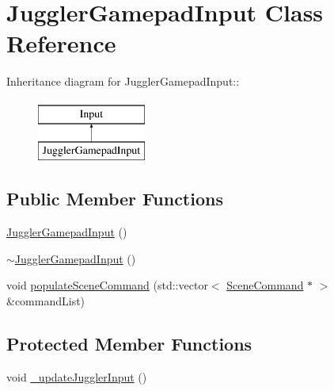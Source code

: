 \hypertarget{class_juggler_gamepad_input}{
\section{JugglerGamepadInput Class Reference}
\label{class_juggler_gamepad_input}
}
Inheritance diagram for JugglerGamepadInput::\begin{figure}[H]
\begin{center}
\leavevmode
\includegraphics[height=2cm]{class_juggler_gamepad_input}
\end{center}
\end{figure}
\subsection*{Public Member Functions}
\begin{DoxyCompactItemize}
\item 
\hyperlink{class_juggler_gamepad_input_a399123ac6edc2d1375648648354049ca}{JugglerGamepadInput} ()
\item 
\hyperlink{class_juggler_gamepad_input_afdbfb9c5eba3c3074771b74937bbe704}{$\sim$JugglerGamepadInput} ()
\item 
void \hyperlink{class_juggler_gamepad_input_aa2ead837a9d4ba9d94701e675b6d61d4}{populateSceneCommand} (std::vector$<$ \hyperlink{class_scene_command}{SceneCommand} $\ast$ $>$ \&commandList)
\end{DoxyCompactItemize}
\subsection*{Protected Member Functions}
\begin{DoxyCompactItemize}
\item 
void \hyperlink{class_juggler_gamepad_input_ab91402ac9790ea085264b759ad9f759e}{\_\-updateJugglerInput} ()
\end{DoxyCompactItemize}
